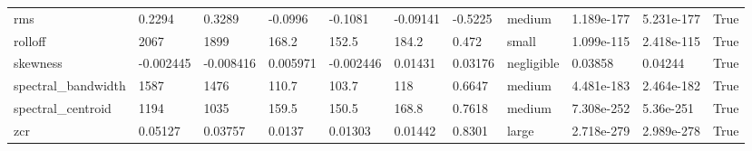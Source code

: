\begin{table}
\begin{tabular}{llllllllllr}
rms & 0.2294 & 0.3289 & -0.0996 & -0.1081 & -0.09141 & -0.5225 & medium & 1.189e-177 & 5.231e-177 & True \\
rolloff & 2067 & 1899 & 168.2 & 152.5 & 184.2 & 0.472 & small & 1.099e-115 & 2.418e-115 & True \\
skewness & -0.002445 & -0.008416 & 0.005971 & -0.002446 & 0.01431 & 0.03176 & negligible & 0.03858 & 0.04244 & True \\
spectral_bandwidth & 1587 & 1476 & 110.7 & 103.7 & 118 & 0.6647 & medium & 4.481e-183 & 2.464e-182 & True \\
spectral_centroid & 1194 & 1035 & 159.5 & 150.5 & 168.8 & 0.7618 & medium & 7.308e-252 & 5.36e-251 & True \\
zcr & 0.05127 & 0.03757 & 0.0137 & 0.01303 & 0.01442 & 0.8301 & large & 2.718e-279 & 2.989e-278 & True \\
\bottomrule
\end{tabular}
\end{table}
